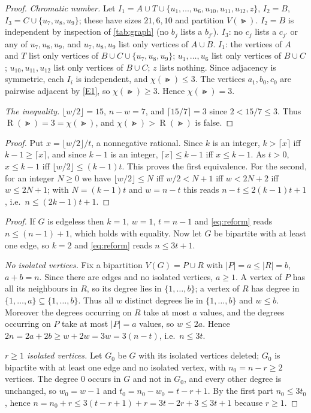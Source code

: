 \documentclass[11pt,a4paper]{article}
\theoremstyle{plain}
\theoremstyle{definition}
\theoremstyle{remark}
\newcommand{\fl}[1]{\lfloor #1\rfloor}
\newcommand{\ce}[1]{\lceil #1\rceil}
\newcommand{\RHS}{\operatorname{R}}
\begin{document}
\begin{proof}
\emph{Chromatic number.} Let $I_1=A\cup T\cup\{u_1,\dots,u_6,u_{10},u_{11},u_{12},z\}$, $I_2=B$, $I_3=C\cup\{u_7,u_8,u_9\}$; these have sizes $21,6,10$ and partition $V(\Gt)$. $I_2=B$ is independent by inspection of \cref{tab:graph} (no $b_j$ lists a $b_{j'}$). $I_3$: no $c_j$ lists a $c_{j'}$ or any of $u_7,u_8,u_9$, and $u_7,u_8,u_9$ list only vertices of $A\cup B$. $I_1$: the vertices of $A$ and $T$ list only vertices of $B\cup C\cup\{u_7,u_8,u_9\}$; $u_1,\dots,u_6$ list only vertices of $B\cup C$; $u_{10},u_{11},u_{12}$ list only vertices of $B\cup C$; $z$ lists nothing. Since adjacency is symmetric, each $I_i$ is independent, and $\chi(\Gt)\le3$. The vertices $a_1,b_0,c_0$ are pairwise adjacent by \ref{E1}, so $\chi(\Gt)\ge3$. Hence $\chi(\Gt)=3$.

\emph{The inequality.} $\fl{w/2}=15$, $n-w=7$, and $\ce{15/7}=3$ since $2<15/7\le3$. Thus $\RHS(\Gt)=3=\chi(\Gt)$, and $\chi(\Gt)>\RHS(\Gt)$ is false.
\end{proof}

\label{pf:reform}
\lemreform*
\begin{proof}
Put $x=\fl{w/2}/t$, a nonnegative rational. Since $k$ is an integer, $k>\ce{x}$ iff $k-1\ge\ce{x}$, and since $k-1$ is an integer, $\ce{x}\le k-1$ iff $x\le k-1$. As $t>0$, $x\le k-1$ iff $\fl{w/2}\le(k-1)t$. This proves the first equivalence. For the second, for an integer $N\ge0$ we have $\fl{w/2}\le N$ iff $w/2<N+1$ iff $w<2N+2$ iff $w\le2N+1$; with $N=(k-1)t$ and $w=n-t$ this reads $n-t\le2(k-1)t+1$, i.e.\ $n\le(2k-1)t+1$.
\end{proof}

\label{pf:bip}
\lembip*
\begin{proof}
If $G$ is edgeless then $k=1$, $w=1$, $t=n-1$ and \eqref{eq:reform} reads $n\le(n-1)+1$, which holds with equality. Now let $G$ be bipartite with at least one edge, so $k=2$ and \eqref{eq:reform} reads $n\le3t+1$.

\emph{No isolated vertices.} Fix a bipartition $V(G)=P\cup R$ with $|P|=a\le|R|=b$, $a+b=n$. Since there are edges and no isolated vertices, $a\ge1$. A vertex of $P$ has all its neighbours in $R$, so its degree lies in $\{1,\dots,b\}$; a vertex of $R$ has degree in $\{1,\dots,a\}\subseteq\{1,\dots,b\}$. Thus all $w$ distinct degrees lie in $\{1,\dots,b\}$ and $w\le b$. Moreover the degrees occurring on $R$ take at most $a$ values, and the degrees occurring on $P$ take at most $|P|=a$ values, so $w\le2a$. Hence $2n=2a+2b\ge w+2w=3w=3(n-t)$, i.e.\ $n\le3t$.

\emph{$r\ge1$ isolated vertices.} Let $G_0$ be $G$ with its isolated vertices deleted; $G_0$ is bipartite with at least one edge and no isolated vertex, with $n_0=n-r\ge2$ vertices. The degree $0$ occurs in $G$ and not in $G_0$, and every other degree is unchanged, so $w_0=w-1$ and $t_0=n_0-w_0=t-r+1$. By the first part $n_0\le3t_0$, hence $n=n_0+r\le3(t-r+1)+r=3t-2r+3\le3t+1$ because $r\ge1$.
\end{proof}
\end{document}
